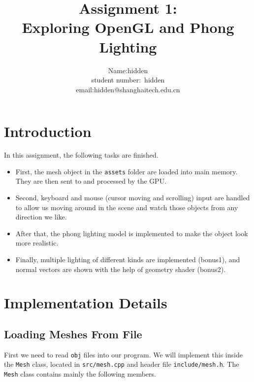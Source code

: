 \documentclass[acmtog]{acmart}
\title{Assignment 1:\\ {Exploring OpenGL and Phong Lighting}}
\author{Name:\quad hidden \\ student number:\ hidden
\\email:\quad hidden@shanghaitech.edu.cn}
\begin{document}
\maketitle

\vspace*{2 ex}

\section{Introduction}

In this assignment, the following tasks are finished.

\begin{itemize}
	\item First, the mesh object in the \texttt{assets} folder are loaded into main memory. They are then sent to and processed by the GPU.
	\item Second, keyboard and mouse (cursor moving and scrolling) input are handled to allow us moving around in the scene and watch those objects from any direction we like. 
	\item After that, the phong lighting model is implemented to make the object look more realistic.
	\item Finally, multiple lighting of different kinds are implemented (bonus1), and normal vectors are shown with the help of geometry shader (bonus2).
\end{itemize}





\section{Implementation Details}

\subsection{Loading Meshes From File}

First we need to read \texttt{obj} files into our program. We will implement this inside the \texttt{Mesh} class, located in \texttt{src/mesh.cpp} and header file \texttt{include/mesh.h}. The \texttt{Mesh} class contains mainly the following members.
\end{document}
